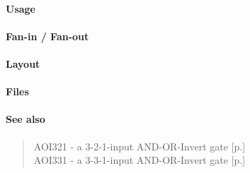 \paragraph{Usage}

\paragraph{Fan-in / Fan-out}

\paragraph{Layout}

\paragraph{Files}

\paragraph{See also}
\begin{quote}
    AOI321 - a 3-2-1-input AND-OR-Invert gate [p.\pageref{AOI321}] \\
    AOI331 - a 3-3-1-input AND-OR-Invert gate [p.\pageref{AOI331}]
\end{quote}
